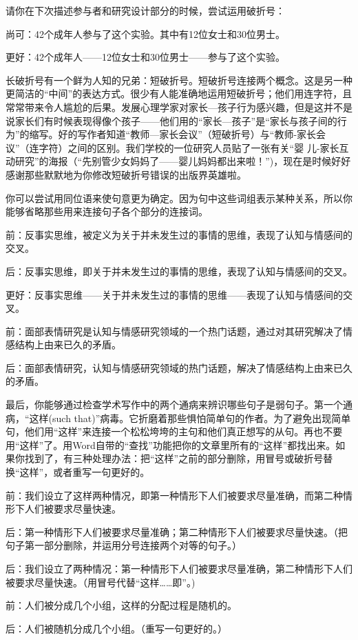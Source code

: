 请你在下次描述参与者和研究设计部分的时候，尝试运用破折号：

{\kaishu 尚可：42个成年人参与了这个实验。其中有12位女士和30位男士。

更好：42个成年人——12位女士和30位男士——参与了这个实验。}

长破折号有一个鲜为人知的兄弟：短破折号。短破折号连接两个概念。这是另一种更简洁的“中间”的表达方式。很少有人能准确地运用短破折号；他们用连字符，且常常带来令人尴尬的后果。发展心理学家对家长—孩子行为感兴趣，但是这并不是说家长们有时候表现得像个孩子——他们用的“家长—孩子”是“家长与孩子间的行为”的缩写。好的写作者知道“教师—家长会议”（短破折号）与“教师-家长会议”（连字符）之间的区别。我们学校的一位研究人员贴了一张有关“婴
儿-家长互动研究”的海报（“先别管少女妈妈了——婴儿妈妈都出来啦！”)，现在是时候好好感谢那些默默地为你修改短破折号错误的出版界英雄啦。

你可以尝试用同位语来使句意更为确定。因为句中这些词组表示某种关系，所以你能够省略那些用来连接句子各个部分的连接词。

{\kaishu 前：反事实思维，被定义为关于并未发生过的事情的思维，表现了认知与情感间的交叉。

后：反事实思维，即关于并未发生过的事情的思维，表现了认知与情感间的交叉。

更好：反事实思维——关于并未发生过的事情的思维——表现了认知与情感间的交叉。

前：面部表情研究是认知与情感研究领域的一个热门话题，通过对其研究解决了情感结构上由来已久的矛盾。

后：面部表情研究，认知与情感研究领域的热门话题，解决了情感结构上由来已久的矛盾。}

最后，你能够通过检查学术写作中的两个通病来辨识哪些句子是弱句子。第一个通病，“这样(such that)”病毒。它折磨着那些惧怕简单句的作者。为了避免出现简单句，他们用“这样”来连接一个松松垮垮的主句和他们真正想写的从句。再也不要用“这样”了。用Word自带的“查找”功能把你的文章里所有的“这样”都找出来。如果你找到了，有三种处理办法：把“这样”之前的部分删除，用冒号或破折号替换“这样”，或者重写一句更好的。

{\kaishu 前：我们设立了这样两种情况，即第一种情形下人们被要求尽量准确，而第二种情形下人们被要求尽量快速。

后：第一种情形下人们被要求尽量准确；第二种情形下人们被要求尽量快速。（把句子第一部分删除，并运用分号连接两个对等的句子。）

后：我们设立了两种情况：第一种情形下人们被要求尽量准确，第二种情形下人们被要求尽量快速。（用冒号代替“这样……即”。)

前：人们被分成几个小组，这样的分配过程是随机的。

后：人们被随机分成几个小组。（重写一句更好的。）}

